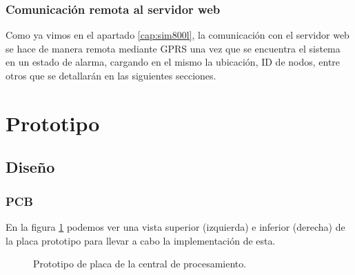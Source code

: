\subsubsection{Comunicación remota al servidor web}
\par Como ya vimos en el apartado \ref{cap:sim800l}, la comunicación con el servidor web se hace de manera remota mediante GPRS una vez que se encuentra el sistema en un estado de alarma, cargando en el mismo la ubicación, ID de nodos, entre otros que se detallarán en las siguientes secciones. 

\section{Prototipo}
\subsection{Diseño}
\subsubsection{PCB}
\par En la figura \ref{im:pcb-prototipo} podemos ver una vista superior (izquierda) e inferior (derecha) de la placa prototipo para llevar a cabo la implementación de esta. 
\begin{figure}[h!]
\begin{center}
    \caption{Prototipo de placa de la central de procesamiento.}
	\label{im:pcb-prototipo}
\end{center}
\end{figure}

